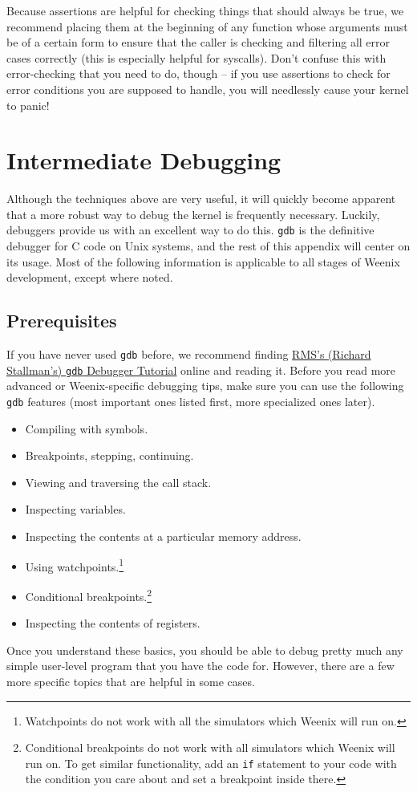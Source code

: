Because assertions are helpful for checking things that should always be true, we recommend placing them at the beginning of any function whose arguments must be of a certain form to ensure that the caller is checking and filtering all error cases correctly (this is especially helpful for syscalls). Don't confuse this with error-checking that you need to do, though -- if you use assertions to check for error conditions you are supposed to handle, you will needlessly cause your kernel to panic!

\section{Intermediate Debugging}

Although the techniques above are very useful, it will quickly become apparent that a more robust way to debug the kernel is frequently necessary. Luckily, debuggers provide us with an excellent way to do this. \texttt{gdb} is the definitive debugger for C code on Unix systems, and the rest of this appendix will center on its usage. Most of the following information is applicable to all stages of Weenix development, except where noted.

\subsection{Prerequisites}
If you have never used \texttt{gdb} before, we recommend finding \hyperref{http://www.unknownroad.com/rtfm/gdbtut/gdbtoc.html}{}{}{RMS's (Richard Stallman's) \texttt{gdb} Debugger Tutorial} online and reading it. Before you read more advanced or Weenix-specific debugging tips, make sure you can use the following \texttt{gdb} features (most important ones listed first, more specialized ones later).
\begin{itemize}
    \item Compiling with symbols.
    \item Breakpoints, stepping, continuing.
    \item Viewing and traversing the call stack.
    \item Inspecting variables.
    \item Inspecting the contents at a particular memory address.
    \item Using watchpoints.\footnote{Watchpoints do not work with all the simulators which Weenix will run on.}
    \item Conditional breakpoints.\footnote{Conditional breakpoints do not work with all simulators which Weenix will run on. To get similar functionality, add an \texttt{if} statement to your code with the condition you care about and set a breakpoint inside there.}
    \item Inspecting the contents of registers.
\end{itemize}
Once you understand these basics, you should be able to debug pretty much any simple user-level program that you have the code for. However, there are a few more specific topics that are helpful in some cases.

